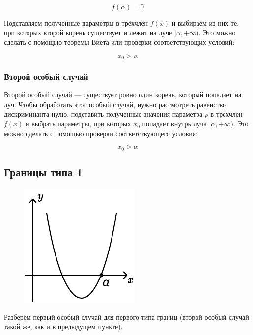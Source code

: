 \begin {equation*}
    f(\alpha) = 0
\end {equation*}

Подставляем полученные параметры в трёхчлен $f(x)$ и выбираем из них те, при которых второй корень 
существует и лежит на луче $[\alpha, +\infty)$.  Это можно
сделать с помощью теоремы Виета или проверки соответствующих условий:

\begin {equation*}
    x_0 > \alpha
\end {equation*}

\subsubsection {Второй особый случай}

Второй особый случай --- существует ровно один корень, который попадает на луч. Чтобы обработать
этот особый случай, нужно рассмотреть равенство дискриминанта нулю, подставить полученные значения
параметра $p$ в трёхчлен $f(x)$ и выбрать параметры, при которых $x_0$ попадает внутрь луча
$[\alpha, +\infty)$. Это можно сделать с помощью проверки соответствующего условия:

\begin {equation*}
    x_0 > \alpha
\end {equation*}

\subsection {Границы типа 1}

\begin {figure}[h]
    \begin {minipage} [t] {\linewidth}
        \centering
        \includegraphics [width=0.3\linewidth] {image/image_19.pdf}
    \end {minipage}
\end {figure}

Разберём первый особый случай для первого типа границ (второй особый случай такой же, как и в 
предыдущем пункте).

